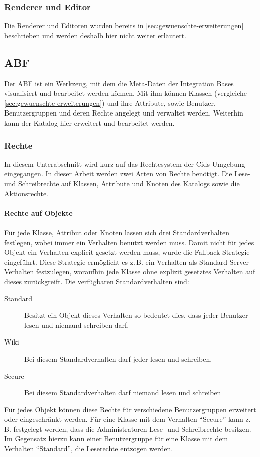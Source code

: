 \subsubsection{Renderer und Editor}
Die Renderer und Editoren wurden bereits in \autoref{sec:gewuenschte-erweiterungen} beschrieben und werden deshalb hier nicht weiter erläutert.

\subsection{ABF}
Der \ac{ABF} ist ein Werkzeug, mit dem die Meta-Daten der Integration Bases visualisiert und bearbeitet werden können.
Mit ihm können Klassen (vergleiche \autoref{sec:gewuenschte-erweiterungen}) und ihre Attribute, sowie Benutzer, Benutzergruppen und deren Rechte angelegt und verwaltet werden.
Weiterhin kann der Katalog hier erweitert und bearbeitet werden.

\subsubsection{Rechte}
In diesem Unterabschnitt wird kurz auf das Rechtesystem der Cids-Umgebung eingegangen. In dieser Arbeit werden zwei Arten von Rechte benötigt. Die Lese- und Schreibrechte auf Klassen, Attribute und Knoten des Katalogs sowie die Aktionsrechte.

\paragraph{Rechte auf Objekte}
Für jede Klasse, Attribut oder Knoten lassen sich drei Standardverhalten festlegen, wobei immer ein Verhalten benutzt werden muss.
Damit nicht für jedes Objekt ein Verhalten explicit gesetzt werden muss, wurde die Fallback Strategie eingeführt.
Diese Strategie ermöglicht es z.\,B. ein Verhalten als Standard-Server-Verhalten festzulegen, woraufhin jede Klasse ohne explizit gesetztes Verhalten auf dieses zurückgreift.
Die verfügbaren Standardverhalten sind:
\begin{description}
\item[Standard] Besitzt ein Objekt dieses Verhalten so bedeutet dies, dass jeder Benutzer lesen und niemand schreiben darf.
\item[Wiki] Bei diesem Standardverhalten darf jeder lesen und schreiben.
\item[Secure] Bei diesem Standardverhalten darf niemand lesen und schreiben
\end{description}
Für jedes Objekt können diese Rechte für verschiedene Benutzergruppen erweitert oder eingeschränkt werden.
Für eine Klasse mit dem Verhalten "`Secure"' kann z.\,B. festgelegt werden, dass die Administratoren Lese- und Schreibrechte besitzen.
Im Gegensatz hierzu kann einer Benutzergruppe für eine Klasse mit dem Verhalten "`Standard"', die Leserechte entzogen werden. \autocite[vgl.][]{cismet-workshop}


